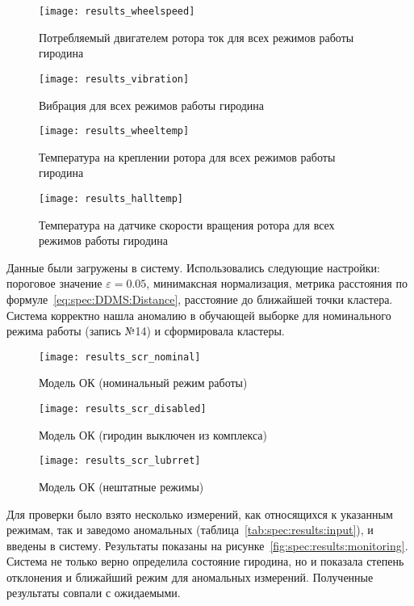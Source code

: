 \begin{figure}[h]
\texttt{[image: results\_wheelspeed]}
\caption{Потребляемый двигателем ротора ток для всех режимов работы гиродина}
\label{fig:spec:results:current}
\end{figure}

\begin{figure}[h]
\texttt{[image: results\_vibration]}
\caption{Вибрация для всех режимов работы гиродина}
\label{fig:spec:results:vibration}
\end{figure}

\begin{figure}[h]
\texttt{[image: results\_wheeltemp]}
\caption{Температура на креплении ротора для всех режимов работы гиродина}
\label{fig:spec:results:wheeltemp}
\end{figure}

\begin{figure}[h]
\texttt{[image: results\_halltemp]}
\caption{Температура на датчике скорости вращения ротора для всех режимов работы гиродина}
\label{fig:spec:results:halltemp}
\end{figure}

Данные были загружены в систему. Использовались следующие настройки: пороговое значение $\varepsilon=0.05$, минимаксная нормализация, метрика расстояния по формуле~\eqref{eq:spec:DDMS:Distance}, расстояние до ближайшей точки кластера. Система корректно нашла аномалию в обучающей выборке для номинального режима работы (запись №14) и сформировала кластеры.

\begin{figure}
\caption{Модель ОК (номинальный режим работы)}
\label{fig:spec:results:scr:nominal}
\texttt{[image: results\_scr\_nominal]}
\end{figure}

\begin{figure}
\caption{Модель ОК (гиродин выключен из комплекса)}
\label{fig:spec:results:scr:disabled}
\texttt{[image: results\_scr\_disabled]}
\end{figure}

\begin{figure}
\caption{Модель ОК (нештатные режимы)}
\label{fig:spec:results:scr:lubrret}
\texttt{[image: results\_scr\_lubrret]}
\end{figure}

Для проверки было взято несколько измерений, как относящихся к указанным режимам, так и заведомо аномальных (таблица~\ref{tab:spec:results:input}), и введены в систему. Результаты показаны на рисунке~\ref{fig:spec:results:monitoring}. Система не только верно определила состояние гиродина, но и показала степень отклонения и ближайший режим для аномальных измерений. Полученные результаты совпали с ожидаемыми.

